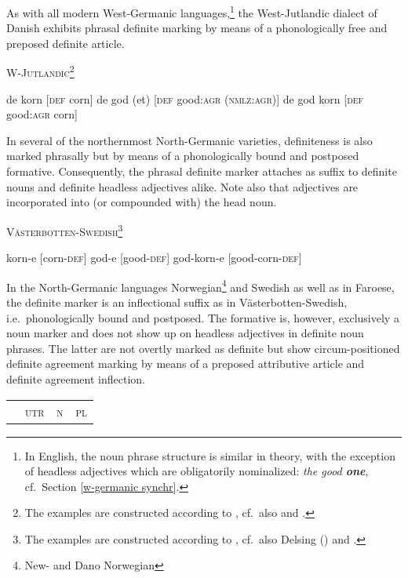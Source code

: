 {As with all modern West-Germanic languages,\footnote{In English, the noun phrase structure is similar in theory, with the exception of headless adjectives which are obligatorily nominalized: \textit{the good \textbf{one}}, cf.~Section \ref{w-germanic synchr}.} the West-Jutlandic dialect of Danish exhibits phrasal definite marking by means of a phonologically free and preposed definite article.
\begin{exe}
\ex \textsc{W-Jutlandic}\footnote{The examples are constructed according to \cite{lund1932}, cf.~also \citet[121–122]{delsing1993} and \citet{dahl2003}.}
\begin{xlist}
\ex de korn [\textsc{def} corn]
\ex de god (et) [\textsc{def} good:\textsc{agr} (\textsc{nmlz:agr})]
\ex de god korn [\textsc{def} good:\textsc{agr} corn]
\end{xlist}
\end{exe}
In several of the northernmost North-Germanic varieties, definiteness is also marked phrasally but by means of a phonologically bound and postposed formative. Consequently, the phrasal definite marker attaches as suffix to definite nouns and definite headless adjectives alike. Note also that adjectives are incorporated into (or compounded with) the head noun. 
\begin{exe}
\ex \textsc{Västerbotten-Swedish}\footnote{The examples are constructed according to \cite{astrom1893}, cf.~also Delsing (\citeyear[122–123]{delsing1993}) and \cite{dahl2003}.}
\begin{xlist}
\ex korn-e [corn-\textsc{def}]
\ex god-e [good-\textsc{def}]
\ex god-korn-e [good-corn-\textsc{def}]
\end{xlist}
\end{exe}
In the North-Germanic languages Norwegian\footnote{New- and Dano Norwegian} and Swedish as well as in Faroese, the definite marker is an inflectional suffix as in Västerbotten-Swedish, i.e.~phonologically bound and postposed. The formative is, however, exclusively a noun marker and does not show up on headless adjectives in definite noun phrases. The latter are not overtly marked as definite but show circum-positioned definite agreement marking by means of a preposed attributive article and definite agreement inflection.
\begin{table}[h]
\begin{center}
\begin{footnotesize}
\begin{tabular}{l | ccc}
\hline
\hline
&\textsc{utr}	&\textsc{n}		&\textsc{pl}\\

\end{tabular}
\end{footnotesize}
\end{center}
\end{table}}
